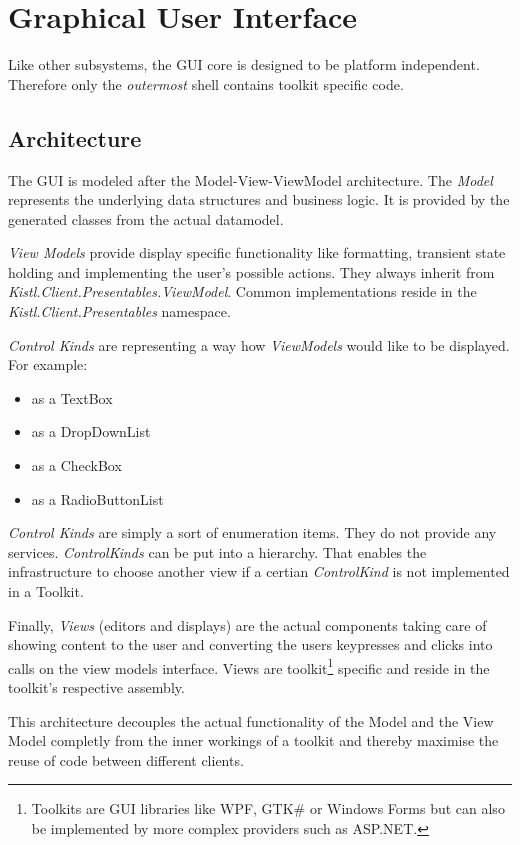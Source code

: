 \section{Graphical User Interface}

Like other subsystems, the GUI core is designed to be platform
independent. Therefore only the \emph{outermost} shell contains toolkit
specific code.

\subsection{Architecture}

The GUI is modeled after the Model-View-ViewModel architecture. The
\emph{Model} represents the underlying data structures and business
logic. It is provided by the generated classes from the actual
datamodel. 

\emph{View Models} provide
display specific functionality like formatting, transient state holding
and implementing the user's possible actions. They always inherit from
\emph{Kistl.Client.Presentables.ViewModel}.
Common implementations reside in the
\emph{Kistl.Client.Presentables} namespace.

\emph{Control Kinds} are representing a way how \emph{ViewModels} would like to be displayed. For example:

\begin{itemize}
\item as a TextBox
\item as a DropDownList
\item as a CheckBox
\item as a RadioButtonList
\end{itemize}

\emph{Control Kinds} are simply a sort of enumeration items. They do not provide any services. 
\emph{ControlKinds} can be put into a hierarchy. That enables the infrastructure to choose another view if a certian 
\emph{ControlKind} is not implemented in a Toolkit.
 
Finally,
\emph{Views} (editors and displays) are the actual components taking
care of showing content to the user and converting the users keypresses
and clicks into calls on the view models interface.  Views are
toolkit\footnote{Toolkits are GUI libraries like WPF, GTK\# or Windows
Forms but can also be implemented by more complex providers such as
ASP.NET.} specific and reside in the toolkit's respective assembly.

This architecture decouples the actual functionality of the Model and
the View Model completly from the inner workings of a toolkit and
thereby maximise the reuse of code between different clients.

